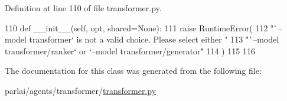 Definition at line 110 of file transformer.\+py.


\begin{DoxyCode}
110     \textcolor{keyword}{def }\_\_init\_\_(self, opt, shared=None):
111         \textcolor{keywordflow}{raise} RuntimeError(
112             \textcolor{stringliteral}{"`--model transformer` is not a valid choice. Please select either "}
113             \textcolor{stringliteral}{"`--model transformer/ranker` or `--model transformer/generator"}
114         )
115 
116 
\end{DoxyCode}


The documentation for this class was generated from the following file\+:\begin{DoxyCompactItemize}
\item 
parlai/agents/transformer/\hyperlink{transformer_8py}{transformer.\+py}\end{DoxyCompactItemize}
